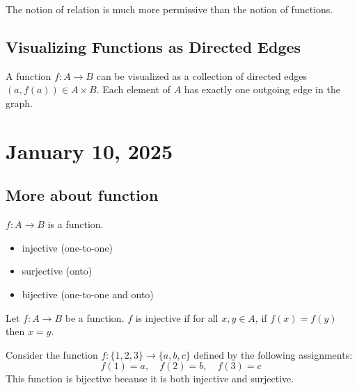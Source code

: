 \documentclass[11pt]{article}
\begin{document}
\begin{fact}
    The notion of relation is much more permissive than the notion of functions.
\end{fact}

\subsection{Visualizing Functions as Directed Edges}
A function $f: A \to B$ can be visualized as a collection of directed edges
$(a, f(a)) \in A \times B$. Each element of $A$ has exactly one outgoing edge
in the graph.

\begin{center}
\end{center}
\section{January 10, 2025}
\subsection{More about function}

\(f : A \rightarrow B\) is a function.
\begin{itemize}
    \item injective (one-to-one)
    \item surjective (onto)
    \item bijective (one-to-one and onto)
\end{itemize}

\begin{definition}
    Let \(f: A \rightarrow B\) be a function. \(f\) is injective if for all \(x, y \in A\), if \(f(x) = f(y)\) then \(x = y\).
\end{definition}
\begin{example}
    Consider the function $f: \{1, 2, 3\} \to \{a, b, c\}$ defined by the following assignments:
    \[
        f(1) = a, \quad f(2) = b, \quad f(3) = c
    \]
    This function is bijective because it is both injective and surjective.
\end{example}
\end{document}
